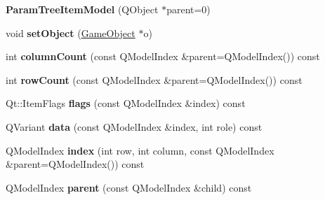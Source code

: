 \begin{DoxyCompactItemize}
\item 
\hypertarget{class_param_tree_item_model_a6b341ed1846d23343c87f590e2092384}{{\bfseries \-Param\-Tree\-Item\-Model} (\-Q\-Object $\ast$parent=0)}\label{class_param_tree_item_model_a6b341ed1846d23343c87f590e2092384}

\item 
\hypertarget{class_param_tree_item_model_ac36443fa32028a78c00213f7eb5764ea}{void {\bfseries set\-Object} (\hyperlink{class_game_object}{\-Game\-Object} $\ast$o)}\label{class_param_tree_item_model_ac36443fa32028a78c00213f7eb5764ea}

\item 
\hypertarget{class_param_tree_item_model_a9d8995b1e52f919b7a499c4c9bf063f0}{int {\bfseries column\-Count} (const \-Q\-Model\-Index \&parent=\-Q\-Model\-Index()) const }\label{class_param_tree_item_model_a9d8995b1e52f919b7a499c4c9bf063f0}

\item 
\hypertarget{class_param_tree_item_model_ac418704d2e3523be67c0f0b6a84a89e2}{int {\bfseries row\-Count} (const \-Q\-Model\-Index \&parent=\-Q\-Model\-Index()) const }\label{class_param_tree_item_model_ac418704d2e3523be67c0f0b6a84a89e2}

\item 
\hypertarget{class_param_tree_item_model_aefec4a35999fc4f2d7d73519e4cc365c}{\-Qt\-::\-Item\-Flags {\bfseries flags} (const \-Q\-Model\-Index \&index) const }\label{class_param_tree_item_model_aefec4a35999fc4f2d7d73519e4cc365c}

\item 
\hypertarget{class_param_tree_item_model_af10f91b1a74c8ebafd54ea33a79171a7}{\-Q\-Variant {\bfseries data} (const \-Q\-Model\-Index \&index, int role) const }\label{class_param_tree_item_model_af10f91b1a74c8ebafd54ea33a79171a7}

\item 
\hypertarget{class_param_tree_item_model_a52aef89025ac950609ade003b39bbea7}{\-Q\-Model\-Index {\bfseries index} (int row, int column, const \-Q\-Model\-Index \&parent=\-Q\-Model\-Index()) const }\label{class_param_tree_item_model_a52aef89025ac950609ade003b39bbea7}

\item 
\hypertarget{class_param_tree_item_model_a4942c654333ea9cfebd921d0be77863a}{\-Q\-Model\-Index {\bfseries parent} (const \-Q\-Model\-Index \&child) const }\label{class_param_tree_item_model_a4942c654333ea9cfebd921d0be77863a}


\end{DoxyCompactItemize}
